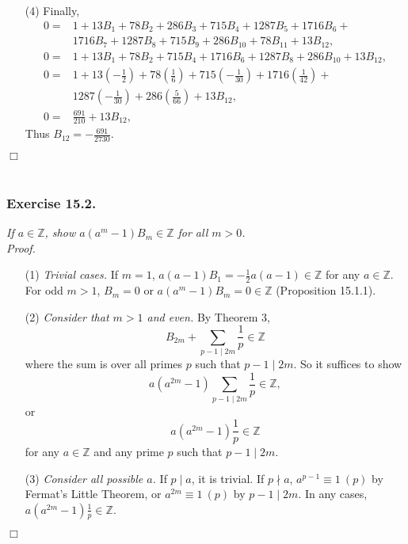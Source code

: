 \documentclass{article}
\begin{document}
\begin{enumerate}
\item[(4)]
Finally,
\begin{align*}
0 =& 1 + 13 B_1 + 78 B_2 + 286 B_3 + 715 B_4 + 1287 B_5 + 1716 B_6 + \\
   & 1716 B_7 + 1287 B_8 + 715 B_9 + 286 B_{10} + 78 B_{11} + 13 B_{12}, \\
0 =& 1 + 13 B_1 + 78 B_2 + 715 B_4 + 1716 B_6 + 1287 B_8 + 286 B_{10} + 13 B_{12}, \\
0 =& 1 + 13 \left( -\frac{1}{2} \right) +
     78 \left( \frac{1}{6} \right) +
     715 \left( -\frac{1}{30} \right) +
     1716 \left( \frac{1}{42} \right) + \\
   & 1287 \left( -\frac{1}{30} \right) +
     286 \left( \frac{5}{66} \right) +
     13 B_{12}, \\
0 =& \frac{691}{210} + 13 B_{12},
\end{align*}
Thus $B_{12} = -\frac{691}{2730}$.
\end{enumerate}
$\Box$\\\\






\subsubsection*{Exercise 15.2.}
\emph{If $a \in \mathbb{Z}$,
show $a(a^m - 1)B_m \in \mathbb{Z}$ for all $m > 0$.} \\

\emph{Proof.}
\begin{enumerate}
\item[(1)] \emph{Trivial cases.}
If $m = 1$, $a(a - 1) B_1 = -\frac{1}{2} a(a - 1) \in \mathbb{Z}$ for any $a \in \mathbb{Z}$.
For odd $m > 1$, $B_m = 0$ or $a(a^m - 1)B_m = 0 \in \mathbb{Z}$ (Proposition 15.1.1). \\
\item[(2)] \emph{Consider that $m > 1$ and even.}
By Theorem 3,
$$B_{2m} + \sum_{p-1 \mid 2m} \frac{1}{p} \in \mathbb{Z}$$
where the sum is over all primes $p$ such that $p-1 \mid 2m$.
So it suffices to show
$$a(a^{2m} - 1) \sum_{p-1 \mid 2m} \frac{1}{p} \in \mathbb{Z}, $$
or
$$a(a^{2m} - 1) \frac{1}{p} \in \mathbb{Z}$$
for any $a \in \mathbb{Z}$ and any prime $p$ such that $p-1 \mid 2m$.
\item[(3)] \emph{Consider all possible $a$.}
If $p \mid a$, it is trivial.
If $p \nmid a$, $a^{p - 1} \equiv 1 \: (p)$ by Fermat's Little Theorem,
or $a^{2m} \equiv 1 \: (p)$ by $p-1 \mid 2m$.
In any cases, $a(a^{2m} - 1)\frac{1}{p} \in \mathbb{Z}$.
\end{enumerate}
$\Box$ \\\\
\end{document}
